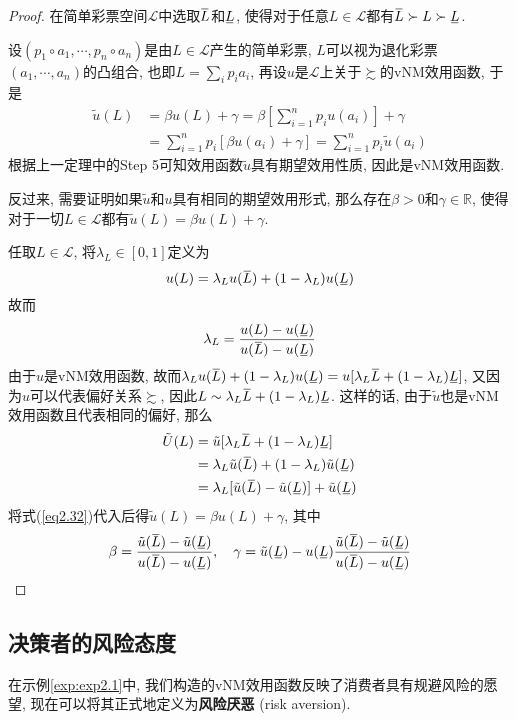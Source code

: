 \documentclass[cn, 12pt, math=mtpro2, bibstyle=apa, blue]{elegantbook}
\newcommand{\R}{\mathbb{R}}
\newcommand{\overbar}[1]{\mkern 1.5mu\overline{\mkern-1.5mu#1\mkern-1.5mu}\mkern 1.5mu}
\newcommand{\ubar}[1]{\mkern 1.5mu\underline{\mkern-1.5mu#1\mkern-1.5mu}\mkern 1.5mu}
\begin{document}
\begin{proof}
  在简单彩票空间$\mathscr{L}$中选取$\overbar{L}$和$\ubar{L}$, 使得对于任意$L\in\mathscr{L}$都有$\overbar{L}\succ L\succ \ubar{L}$.

  设$(p_1\circ a_1,\cdots,p_n\circ a_n)$是由$L\in\mathscr{L}$产生的简单彩票, $L$可以视为退化彩票$(a_1,\cdots,a_n)$的凸组合, 也即$L=\sum_i p_ia_i$, 再设$u$是$\mathscr{L}$上关于$\succsim$的vNM效用函数, 于是
  \begin{align*}
  \tilde{u}(L)&=\beta u(L)+\gamma=\beta\left[\sum_{i=1}^{n}p_iu(a_i)\right]+\gamma \\
  &=\sum_{i=1}^{n}p_i[\beta u(a_i)+\gamma]=\sum_{i=1}^{n}p_i\tilde{u}(a_i)
  \end{align*}
  根据上一定理中的Step 5可知效用函数$\tilde{u}$具有期望效用性质, 因此是vNM效用函数.

  反过来, 需要证明如果$\tilde{u}$和$u$具有相同的期望效用形式, 那么存在$\beta>0$和$\gamma\in\R$, 使得对于一切$L\in\mathscr{L}$都有$\tilde{u}(L)=\beta u(L)+\gamma$.

  任取$L\in\mathscr{L}$, 将$\lambda_L\in[0,1]$定义为
  $$u(L)=\lambda_Lu(\overbar{L})+(1-\lambda_L)u(\ubar{L})$$
  故而
  \begin{equation}\label{eq2.32}
    \lambda_L=\frac{u(L)-u(\ubar{L})}{u(\overbar{L})-u(\ubar{L})}
  \end{equation}
  由于$u$是vNM效用函数, 故而$\lambda_Lu(\overbar{L})+(1-\lambda_L)u(\ubar{L})=u[\lambda_L\overbar{L}+(1-\lambda_L)\ubar{L}]$, 又因为$u$可以代表偏好关系$\succsim$, 因此$L\sim \lambda_L\overbar{L}+(1-\lambda_L)\ubar{L}$. 这样的话, 由于$\tilde{u}$也是vNM效用函数且代表相同的偏好, 那么
  \begin{align*}
  \tilde{U}(L)&=\tilde{u}[\lambda_L\overbar{L}+(1-\lambda_L)\ubar{L}] \\
  &=\lambda_L\tilde{u}(\overbar{L})+(1-\lambda_L)\tilde{u}(\ubar{L}) \\
  &=\lambda_L[\tilde{u}(\overbar{L})-\tilde{u}(\ubar{L})]+\tilde{u}(\ubar{L})
  \end{align*}
  将式(\ref{eq2.32})代入后得$\tilde{u}(L)=\beta u(L)+\gamma$, 其中
  $$\beta=\frac{\tilde{u}(\overbar{L})-\tilde{u}(\ubar{L})}{u(\overbar{L})-u(\ubar{L})},\quad \gamma=\tilde{u}(\ubar{L})-u(\ubar{L})\frac{\tilde{u}(\overbar{L})-\tilde{u}(\ubar{L})}{u(\overbar{L})-u(\ubar{L})}$$

\end{proof}

\subsection{决策者的风险态度}
在示例\ref{exp:exp2.1}中, 我们构造的vNM效用函数反映了消费者具有规避风险的愿望, 现在可以将其正式地定义为\textbf{风险厌恶} (risk aversion).
\end{document}
